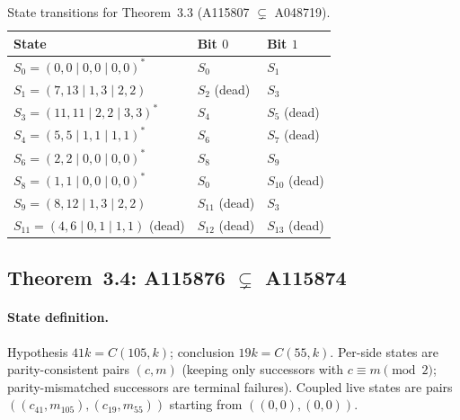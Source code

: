 \documentclass[11pt]{article}
\begin{document}
\begin{table}[ht]
\centering
\small
\begin{tabular}{lll}
\hline
State & Bit $0$ & Bit $1$ \\
\hline
$S_0 = (0,0 \mid 0,0 \mid 0,0)^*$ & $S_0$ & $S_1$ \\
$S_1 = (7,13 \mid 1,3 \mid 2,2)$ & $S_2$ (dead) & $S_3$ \\
$S_3 = (11,11 \mid 2,2 \mid 3,3)^*$ & $S_4$ & $S_5$ (dead) \\
$S_4 = (5,5 \mid 1,1 \mid 1,1)^*$ & $S_6$ & $S_7$ (dead) \\
$S_6 = (2,2 \mid 0,0 \mid 0,0)^*$ & $S_8$ & $S_9$ \\
$S_8 = (1,1 \mid 0,0 \mid 0,0)^*$ & $S_0$ & $S_{10}$ (dead) \\
$S_9 = (8,12 \mid 1,3 \mid 2,2)$ & $S_{11}$ (dead) & $S_3$ \\
$S_{11} = (4,6 \mid 0,1 \mid 1,1)$ (dead) & $S_{12}$ (dead) & $S_{13}$ (dead) \\
\hline
\end{tabular}
\caption{State transitions for Theorem~3.3 (A115807 $\subsetneq$ A048719).}
\label{tab:app-33}
\end{table}

\subsection{Theorem~3.4: A115876 $\subsetneq$ A115874}
\label{app:thm34}

\paragraph{State definition.}
Hypothesis $41k = C(105,k)$; conclusion $19k = C(55,k)$. Per-side states are parity-consistent pairs $(c, m)$ (keeping only successors with $c \equiv m \pmod{2}$; parity-mismatched successors are terminal failures). Coupled live states are pairs $((c_{41}, m_{105}), (c_{19}, m_{55}))$ starting from $((0,0),(0,0))$.
\end{document}
